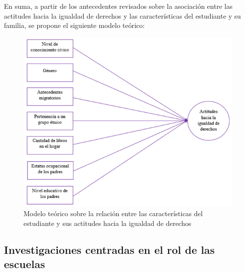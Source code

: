 \documentclass[12pt,twoside]{templates/facsothesis}
\begin{document}
En suma, a partir de los antecedentes revisados sobre la asociación entre las actitudes hacia la igualdad de derechos y las características del estudiante y su familia, se propone el siguiente modelo teórico:

\begin{figure}[!ht]

{\centering \includegraphics[width=0.8\linewidth,]{images/modelo_1} 

}

\caption{Modelo teórico sobre la relación entre las características del estudiante y sus actitudes hacia la igualdad de derechos}\label{fig:modelo1}
\end{figure}

\hypertarget{investigaciones-centradas-en-el-rol-de-las-escuelas}{%
\subsection{Investigaciones centradas en el rol de las escuelas}\label{investigaciones-centradas-en-el-rol-de-las-escuelas}}
\end{document}
